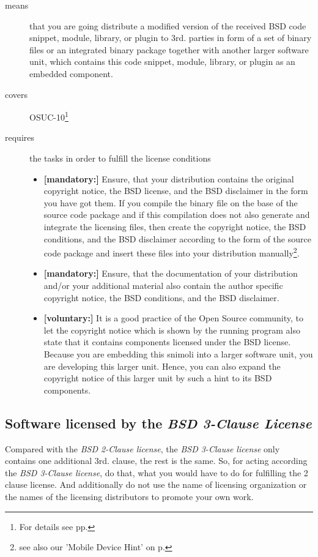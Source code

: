 \begin{description}
\item[means] that you are going distribute a modified version of the received
BSD code snippet, module, library, or plugin to 3rd. parties in form of a set of
binary files or an integrated binary package together with another larger
software unit, which contains this code snippet, module, library, or plugin as
an embedded component.
\item[covers] OSUC-10\footnote{For details see pp. \pageref{OSUC-10-DEF}}
\item[requires] the tasks in order to fulfill the license conditions
\begin{itemize}
  \item  \textbf{[mandatory:]} Ensure, that your distribution contains the
  original copyright notice, the BSD license, and the BSD disclaimer in the form
  you have got them. If you compile the binary file on the base of the source
  code package and if this compilation does not also generate and integrate the
  licensing files, then create the copyright notice, the BSD conditions, and the
  BSD disclaimer according to the form of the source code package and insert
  these files into your distribution manually\footnote{see also our 'Mobile
  Device Hint' on p. \pageref{MobileDeviceHint}}.
  \item  \textbf{[mandatory:]} Ensure, that the documentation of your
  distribution and/or your additional material also contain the author specific
  copyright notice, the BSD conditions, and the BSD disclaimer.
 \item \textbf{[voluntary:]} It is a good practice of the Open Source
  community, to let the copyright notice which is shown by the running program
  also state that it contains components licensed under the BSD license. Because
  you are embedding this snimoli into a larger software unit, you are
  developing this larger unit. Hence, you can also expand the copyright notice
  of this larger unit by such a hint to its BSD components.
\end{itemize}
\end{description}

\subsection{Software licensed by the \emph{BSD 3-Clause License}}

Compared with the \textit{BSD 2-Clause license}, the \textit{BSD 3-Clause
license} only contains one additional 3rd. clause, the rest is the same. So, for
acting according the \textit{BSD 3-Clause license}, do that, what you would have
to do for fulfilling the 2 clause license. And additionally do not use the name
of licensing organization or the names of the licensing distributors to promote
your own work.

